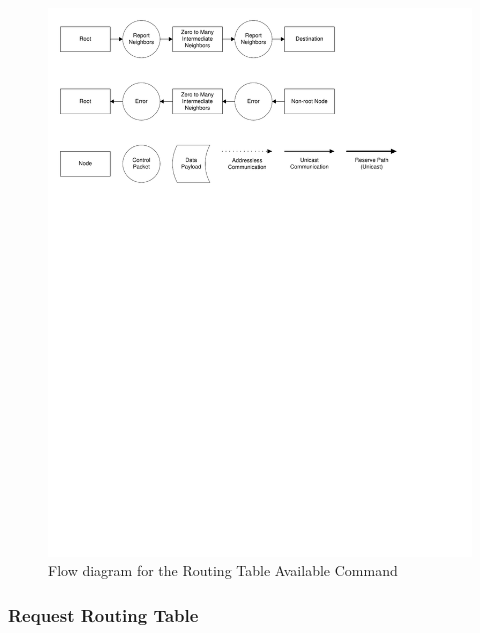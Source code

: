 \begin{figure}[ptb]
	\begin{centering}
		\includegraphics[scale=0.75]{Protocol/Figures/protocol-routing_table_available.pdf}
		\caption{Flow diagram for the Routing Table Available Command}
		\label{fig:protocol:routing_table_available}
	\end{centering}
\end{figure}

\subsubsection{Request Routing Table}\label{ref:protocol:methodology:commands:request_routing_table}

